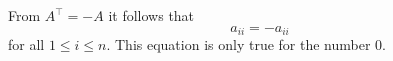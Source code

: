 From $A^\top = - A$ it follows that 
$$a_{ii} = - a_{ii} $$
for all $1 \leq i \leq n$. This equation is only true for the number $0$.
